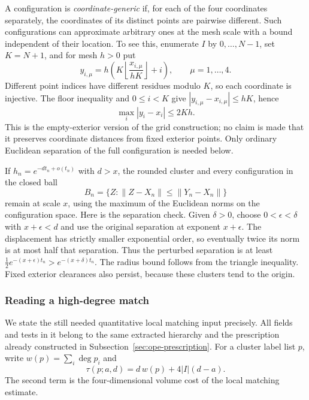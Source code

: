 A configuration is \emph{coordinate-generic} if, for each of the four
coordinates separately, the coordinates of its distinct points are
pairwise different. Such configurations can approximate arbitrary ones
at the mesh scale with a bound independent of their location. To see
this, enumerate $I$ by $0,\ldots,N-1$, set $K=N+1$, and for mesh $h>0$
put
\[
 y_{i,\mu}=h\left(K\left\lfloor\frac{x_{i,\mu}}{hK}\right\rfloor+i\right),
       \qquad \mu=1,\ldots,4.
\]
Different point indices have different residues modulo $K$, so each
coordinate is injective. The floor inequality and $0\leq i<K$ give
$|y_{i,\mu}-x_{i,\mu}|\leq hK$, hence
\begin{equation}\label{eq:ope-grid-round}
 \max_i|y_i-x_i|\leq2Kh.
\end{equation}
This is the empty-exterior version of the grid construction; no claim is
made that it preserves coordinate distances from fixed exterior points.
Only ordinary Euclidean separation of the full configuration is needed
below.

If $h_n=e^{-dt_n+o(t_n)}$ with $d>x$, the rounded cluster and every
configuration in the closed ball
\[
 B_n=\{Z:\|Z-X_n\|\leq\|Y_n-X_n\|\}
\]
remain at scale $x$, using the maximum of the Euclidean norms on the
configuration space. Here is the separation check. Given $\delta>0$,
choose $0<\epsilon<\delta$ with $x+\epsilon<d$ and use the original
separation at exponent $x+\epsilon$. The displacement has strictly
smaller exponential order, so eventually twice its norm is at most half
that separation. Thus the perturbed separation is at least
$\tfrac12e^{-(x+\epsilon)t_n}>e^{-(x+\delta)t_n}$. The radius bound
follows from the triangle inequality. Fixed exterior clearances also
persist, because these clusters tend to the origin.

\subsubsection{Reading a high-degree match}
We state the still needed quantitative local matching input precisely.
All fields and tests in it belong to the same extracted hierarchy and
the prescription already constructed in Subsection~\ref{sec:ope-prescription}.
For a cluster label list $p$, write $w(p)=\sum_i\deg p_i$ and
\[
 \tau(p;a,d)=d\,w(p)+4|I|(d-a).
\]
The second term is the four-dimensional volume cost of the local
matching estimate.

